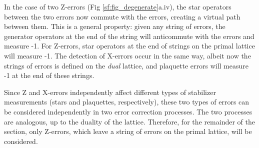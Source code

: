 In the case of two Z-errors (Fig \ref{sf:fig_degenerate}a.iv), the star operators between the two errors now commute with the errors, creating a virtual path between them. This is a general property: given any string of errors, the generator operators at the end of the string will anticommute with the errors and measure -1. For Z-errors, star operators at the end of strings on the primal lattice will measure -1. The detection of X-errors occur in the same way, albeit now the strings of errors is defined on the \emph{dual} lattice, and plaquette errors will measure -1 at the end of these strings.

Since Z and X-errors independently affect different types of stabilizer measurements (stars and plaquettes, respectively), these two types of errors can be considered independently in two error correction processes. The two processes are analogous, up to the duality of the lattice. Therefore, for the remainder of the section, only Z-errors, which leave a string of errors on the primal lattice, will be considered.

